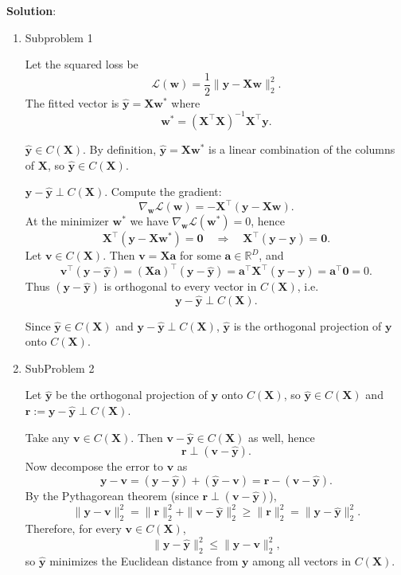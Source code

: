 \documentclass[submit]{harvardml}
\newenvironment{solution}{
    \vspace{2mm}
    \color{blue}\noindent\textbf{Solution}:
}{}
\begin{document}
\begin{solution}
	\begin{enumerate}
	    \item Subproblem 1
        \smallskip

        Let the squared loss be
\[
\mathcal{L}(\mathbf w)=\frac{1}{2}\|\mathbf y-\mathbf X\mathbf w\|_2^2.
\]
The fitted vector is $\hat{\mathbf y}=\mathbf X\mathbf w^*$ where
\[
\mathbf w^*=(\mathbf X^\top \mathbf X)^{-1}\mathbf X^\top \mathbf y.
\]

 $\hat{\mathbf y}\in C(\mathbf X)$.
By definition, $\hat{\mathbf y}=\mathbf X\mathbf w^*$ is a linear combination of the columns of $\mathbf X$,
so $\hat{\mathbf y}\in C(\mathbf X)$.

 $\mathbf y-\hat{\mathbf y}\perp C(\mathbf X)$.
Compute the gradient:
\[
\nabla_{\mathbf w}\mathcal{L}(\mathbf w)
= -\mathbf X^\top(\mathbf y-\mathbf X\mathbf w).
\]
At the minimizer $\mathbf w^*$ we have $\nabla_{\mathbf w}\mathcal{L}(\mathbf w^*)=0$, hence
\[
\mathbf X^\top(\mathbf y-\mathbf X\mathbf w^*)=\mathbf 0
\quad\Longrightarrow\quad
\mathbf X^\top(\mathbf y-\hat{\mathbf y})=\mathbf 0.
\]
Let $\mathbf v\in C(\mathbf X)$. Then $\mathbf v=\mathbf X\mathbf a$ for some $\mathbf a\in\mathbb R^D$, and
\[
\mathbf v^\top(\mathbf y-\hat{\mathbf y})
=(\mathbf X\mathbf a)^\top(\mathbf y-\hat{\mathbf y})
=\mathbf a^\top \mathbf X^\top(\mathbf y-\hat{\mathbf y})
=\mathbf a^\top \mathbf 0
=0.
\]
Thus $(\mathbf y-\hat{\mathbf y})$ is orthogonal to every vector in $C(\mathbf X)$, i.e.
\[
\mathbf y-\hat{\mathbf y}\perp C(\mathbf X).
\]

Since $\hat{\mathbf y}\in C(\mathbf X)$ and $\mathbf y-\hat{\mathbf y}\perp C(\mathbf X)$, $\hat{\mathbf y}$ is
the orthogonal projection of $\mathbf y$ onto $C(\mathbf X)$.

\item SubProblem 2

\smallskip

Let $\hat{\mathbf y}$ be the orthogonal projection of $\mathbf y$ onto $C(\mathbf X)$, so
$\hat{\mathbf y}\in C(\mathbf X)$ and $\mathbf r:=\mathbf y-\hat{\mathbf y}\perp C(\mathbf X)$.

Take any $\mathbf v\in C(\mathbf X)$. Then $\mathbf v-\hat{\mathbf y}\in C(\mathbf X)$ as well, hence
\[
\mathbf r \perp (\mathbf v-\hat{\mathbf y}).
\]
Now decompose the error to $\mathbf v$ as
\[
\mathbf y-\mathbf v
=
(\mathbf y-\hat{\mathbf y})+(\hat{\mathbf y}-\mathbf v)
=
\mathbf r-(\mathbf v-\hat{\mathbf y}).
\]
By the Pythagorean theorem (since $\mathbf r \perp (\mathbf v-\hat{\mathbf y})$),
\[
\|\mathbf y-\mathbf v\|_2^2
=
\|\mathbf r\|_2^2+\|\mathbf v-\hat{\mathbf y}\|_2^2
\ge
\|\mathbf r\|_2^2
=
\|\mathbf y-\hat{\mathbf y}\|_2^2.
\]
Therefore, for every $\mathbf v\in C(\mathbf X)$,
\[
\|\mathbf y-\hat{\mathbf y}\|_2^2 \le \|\mathbf y-\mathbf v\|_2^2,
\]
so $\hat{\mathbf y}$ minimizes the Euclidean distance from $\mathbf y$ among all vectors in $C(\mathbf X)$.


\end{enumerate}
\end{solution}
\end{document}
